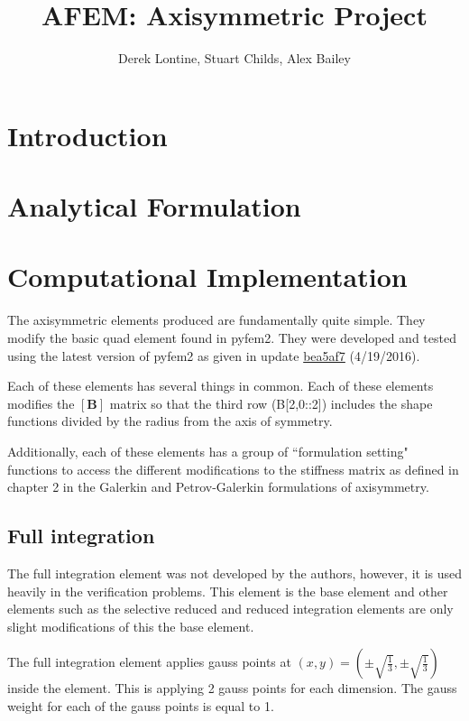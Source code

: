 \documentclass[10pt,letterpaper]{report}
\author{Derek Lontine, Stuart Childs, Alex Bailey}
\title{AFEM: Axisymmetric Project}
\numberwithin{equation}{chapter}
\begin{document}
\maketitle
\chapter{Introduction}

\chapter{Analytical Formulation}

\chapter{Computational Implementation}
The axisymmetric elements produced are fundamentally quite simple. They modify the basic quad element found in pyfem2. They were developed and tested using the latest version of pyfem2 as given in update \hyperlink{https://github.com/tjfulle/pyfem2/commit/bea5af7b7dc98cb5529406c07bc4a8b18ae5e584}{bea5af7} (4/19/2016).

Each of these elements has several things in common. Each of these elements modifies the $[\pmb{B}]$ matrix so that the third row (B[2,0::2]) includes the shape functions divided by the radius from the axis of symmetry.

Additionally, each of these elements has a group of ``formulation setting" functions to access the different modifications to the stiffness matrix as defined in chapter 2 in the Galerkin and Petrov-Galerkin formulations of axisymmetry. 
\section{Full integration}
The full integration element was not developed by the authors, however, it is used heavily in the verification problems. This element is the base element and other elements such as the selective reduced and reduced integration elements are only slight modifications of this the base element.

The full integration element applies gauss points at $(x,y)=(\pm\sqrt{\frac{1}{3}},\pm\sqrt{\frac{1}{3}})$ inside the element. This is applying 2 gauss points for each dimension. The gauss weight for each of the gauss points is equal to 1.
\end{document}
